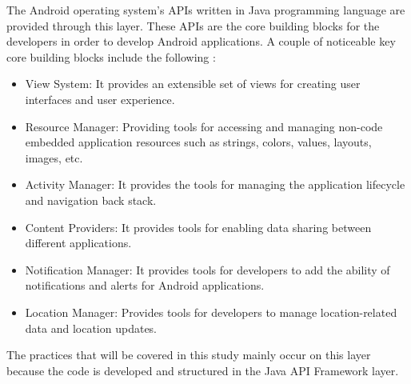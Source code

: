 The Android operating system's APIs written in Java programming language are provided through this layer. These APIs are the core building blocks for the developers in order to develop Android applications. A couple of noticeable key core building blocks include the following \cite{7}:
\begin{itemize}
\item View System: It provides an extensible set of views for creating user interfaces and user experience.
\item Resource Manager: Providing tools for accessing and managing non-code embedded application resources such as strings, colors, values, layouts, images, etc.
\item Activity Manager: It provides the tools for managing the application lifecycle and navigation back stack.
\item Content Providers: It provides tools for enabling data sharing between different applications.
\item Notification Manager: It provides tools for developers to add the ability of notifications and alerts for Android applications.
\item Location Manager: Provides tools for developers to manage location-related data and location updates.
\end{itemize}
The practices that will be covered in this study mainly occur on this layer because the code is developed and structured in the Java API Framework layer.